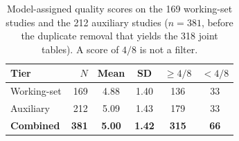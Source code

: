 \begin{table}[htbp]
\centering
\caption{Model-assigned quality scores on the 169 working-set studies and the 212 auxiliary studies ($n = 381$, before the duplicate removal that yields the 318 joint tables). A score of $4/8$ is not a filter.}
\label{tab:qa-combined}
\begin{tabular}{lrcccc}
\toprule
Tier & $N$ & Mean & SD & $\geq 4/8$ & $< 4/8$ \\
\midrule
Working-set & 169 & 4.88 & 1.40 & 136 & 33 \\
Auxiliary   & 212 & 5.09 & 1.43 & 179 & 33 \\
\midrule
\textbf{Combined} & \textbf{381} & \textbf{5.00} & \textbf{1.42} & \textbf{315} & \textbf{66} \\
\bottomrule
\end{tabular}
\end{table}
